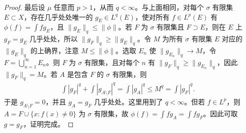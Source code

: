 \documentclass[../../main.tex]{subfiles}
\begin{document}
\begin{proof}
最后设 $\mu$ 任意而 $p>1$，从而 $q<\infty$。与上面相同，对每个 $\sigma$ 有限集 $E\subset X$，存在几乎处处唯一的 $g_E\in L^q(E)$，使对所有 $f\in L^p(E)$ 有 $\phi(f)=\int fg_E$，且 $\|g_E\|_q\leqslant\|\phi\|$。若 $F$ 为 $\sigma$ 有限集且 $F\supset E$，则在 $E$ 上 $g_F=g_E$ 几乎处处，所以 $\|g_F\|_q\geqslant\|g_E\|_q$。令 $M$ 为所有 $\sigma$ 有限集 $E$ 对应的 $\|g_E\|_q$ 的上确界，注意 $M\leqslant\|\phi\|$。选取 $E_n$ 使 $\|g_{E_n}\|_q\to M$，令 $F=\bigcup_{n=1}^\infty E_n$。则 $F$ 为 $\sigma$ 有限集，且对每个 $n$ 有 $\|g_F\|_q\geqslant\|g_{E_n}\|_q$，因此 $\|g_F\|_q=M$。若 $A$ 是包含 $F$ 的 $\sigma$ 有限集，则
\begin{align*}
\int|g_F|^q+\int|g_{A\setminus F}|^q
=\int|g_A|^q\leqslant M^q=\int|g_F|^q.
\end{align*}
于是 $g_{A\setminus F}=0$，并且 $g_A=g_F$ 几乎处处。这里用到了 $q<\infty$。但若 $f\in L^p$，则 $A=F\cup\{x:f(x)\ne0\}$ 为 $\sigma$ 有限集，故 $\phi(f)=\int fg_A=\int fg_F$。因此可取 $g=g_F$，证明完成。
\end{proof}
\end{document}
